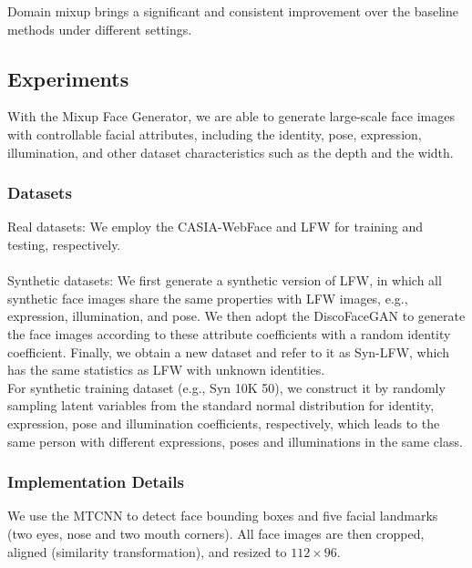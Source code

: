 \documentclass[12pt]{article}
\begin{document}
\begin{itemize}
\begin{center}
  \end{center}
  Domain mixup brings a significant and consistent improvement over the baseline methods under different settings.
\end{itemize}
\subsection{Experiments}
With the Mixup Face Generator, we are able
to generate large-scale face images with controllable facial
attributes, including the identity, pose, expression, illumination, and other dataset characteristics such as the depth
and the width.
\subsubsection{Datasets}
Real datasets: We employ the CASIA-WebFace
and LFW for training and testing, respectively.\\
\\
Synthetic datasets: We first generate a synthetic version of LFW, in which all synthetic face images share the
same properties with LFW images, e.g., expression, illumination, and pose. We then adopt the DiscoFaceGAN to generate the face
images according to these attribute coefficients with a random identity coefficient. Finally, we obtain a new dataset and refer to it as Syn-LFW, which has the same statistics
as LFW with unknown identities.\\
For
synthetic training dataset (e.g., Syn 10K 50), we construct
it by randomly sampling latent variables from the standard
normal distribution for identity, expression, pose and illumination coefficients, respectively, which leads to the same
person with different expressions, poses and illuminations
in the same class. 
\subsubsection{Implementation Details}
We use the MTCNN to detect face bounding boxes
and five facial landmarks (two eyes, nose and two mouth
corners). All face images are then cropped, aligned (similarity transformation), and resized to $112 \times 96$.
\end{document}
